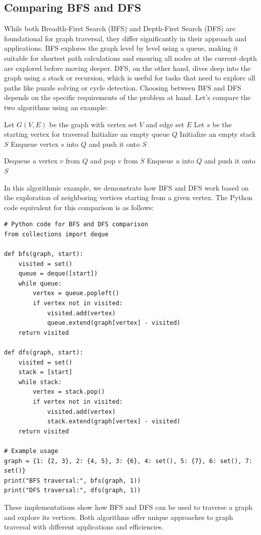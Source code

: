 \documentclass[12pt]{book} %
\begin{document}
\subsection{Comparing BFS and DFS}

While both Breadth-First Search (BFS) and Depth-First Search (DFS) are foundational for graph traversal, they differ significantly in their approach and applications. BFS explores the graph level by level using a queue, making it suitable for shortest path calculations and ensuring all nodes at the current depth are explored before moving deeper. DFS, on the other hand, dives deep into the graph using a stack or recursion, which is useful for tasks that need to explore all paths like puzzle solving or cycle detection. Choosing between BFS and DFS depends on the specific requirements of the problem at hand.
\newline
Let's compare the two algorithms using an example:
\FloatBarrier
\begin{algorithm}
\caption{Comparison of BFS and DFS}
\begin{algorithmic}[1]
\State Let $G(V, E)$ be the graph with vertex set $V$ and edge set $E$
\State Let $s$ be the starting vertex for traversal
\State Initialize an empty queue $Q$
\State Initialize an empty stack $S$
\State Enqueue vertex $s$ into $Q$ and push it onto $S$

    \State Dequeue a vertex $v$ from $Q$ and pop $v$ from $S$
            \State Enqueue $u$ into $Q$ and push it onto $S$
        \EndIf
    \EndFor
\EndWhile
\end{algorithmic}
\end{algorithm}
\FloatBarrier
In this algorithmic example, we demonstrate how BFS and DFS work based on the exploration of neighboring vertices starting from a given vertex. The Python code equivalent for this comparison is as follows:
\FloatBarrier
\begin{lstlisting}
# Python code for BFS and DFS comparison
from collections import deque

def bfs(graph, start):
    visited = set()
    queue = deque([start])
    while queue:
        vertex = queue.popleft()
        if vertex not in visited:
            visited.add(vertex)
            queue.extend(graph[vertex] - visited)
    return visited

def dfs(graph, start):
    visited = set()
    stack = [start]
    while stack:
        vertex = stack.pop()
        if vertex not in visited:
            visited.add(vertex)
            stack.extend(graph[vertex] - visited)
    return visited

# Example usage
graph = {1: {2, 3}, 2: {4, 5}, 3: {6}, 4: set(), 5: {7}, 6: set(), 7: set()}
print("BFS traversal:", bfs(graph, 1))
print("DFS traversal:", dfs(graph, 1))
\end{lstlisting}
\FloatBarrier
These implementations show how BFS and DFS can be used to traverse a graph and explore its vertices. Both algorithms offer unique approaches to graph traversal with different applications and efficiencies.
\end{document}
